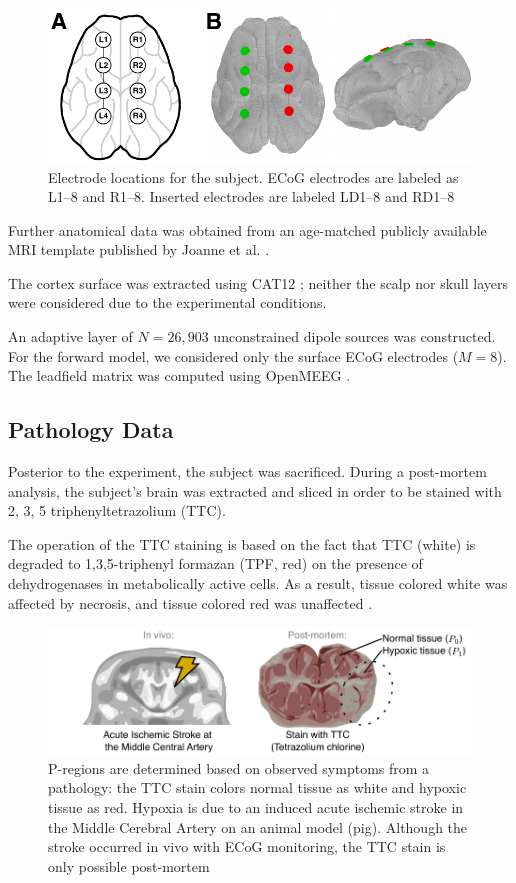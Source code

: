 \begin{figure}
\centering
\includegraphics{./img/electrodes_pig.pdf}
\caption{Electrode locations for the subject. ECoG electrodes are labeled as L1--8 and R1--8. Inserted electrodes are labeled LD1--8 and RD1--8}
\label{fig:pig_elecs}
\end{figure}

Further anatomical data was obtained from an age-matched publicly available MRI template published by Joanne et al. \cite{pig_template}.

The cortex surface was extracted using CAT12 \cite{gaser2022cat}; neither the scalp nor skull layers were considered due to the experimental conditions.

An adaptive layer of $N=26,903$ unconstrained dipole sources was constructed.
%
For the forward model, we considered only the surface ECoG electrodes ($M=8$).
%
The leadfield matrix was computed using OpenMEEG \cite{gramfort2010openmeeg}.

\subsection{Pathology Data}

Posterior to the experiment, the subject was sacrificed.
%
During a post-mortem analysis, the subject's brain was extracted and sliced in order to be stained with 
2, 3, 5 triphenyltetrazolium (TTC).

The operation of the TTC staining is based on the fact that TTC (white) 
is degraded to 1,3,5-triphenyl formazan (TPF, red)
on the presence of dehydrogenases in metabolically active cells.
%
As a result, tissue colored white was affected by necrosis, and tissue colored red was unaffected \cite{li2018use}. 

\begin{figure}
\centering
\includegraphics[width=\linewidth]{./img/Pregions_real.pdf}
\caption{P-regions are determined based on observed symptoms from a pathology: the TTC stain colors normal tissue as white and hypoxic tissue as red.
%
Hypoxia is due to an induced acute ischemic stroke in the Middle Cerebral Artery on an animal model (pig).
%
Although the stroke occurred in vivo with ECoG monitoring, the TTC stain is only possible post-mortem}
\end{figure}

